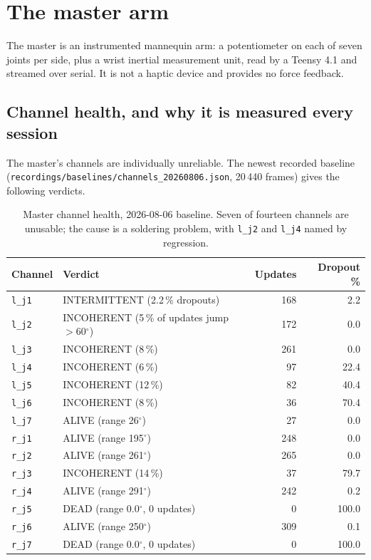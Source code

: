 \documentclass[11pt,a4paper,oneside]{report}
\newcommand{\code}[1]{\texttt{\small #1}}
\newcommand{\file}[1]{\texttt{\small #1}}
\newcommand{\dg}{$^{\circ}$}
\begin{document}
\section{The master arm}

The master is an instrumented mannequin arm: a potentiometer on each of seven
joints per side, plus a wrist inertial measurement unit, read by a Teensy 4.1
and streamed over serial. It is not a haptic device and provides no force
feedback.

\subsection{Channel health, and why it is measured every session}

The master's channels are individually unreliable. The newest recorded
baseline (\file{recordings/baselines/channels\_20260806.json}, 20\,440 frames)
gives the following verdicts.

\begin{table}[H]
\centering
\small
\begin{tabular}{@{}llrr@{}}
\toprule
\textbf{Channel} & \textbf{Verdict} & \textbf{Updates} & \textbf{Dropout \%} \\
\midrule
\code{l\_j1} & INTERMITTENT (2.2\,\% dropouts) & 168 & 2.2 \\
\code{l\_j2} & INCOHERENT (5\,\% of updates jump $>$60\dg) & 172 & 0.0 \\
\code{l\_j3} & INCOHERENT (8\,\%) & 261 & 0.0 \\
\code{l\_j4} & INCOHERENT (6\,\%) & 97 & 22.4 \\
\code{l\_j5} & INCOHERENT (12\,\%) & 82 & 40.4 \\
\code{l\_j6} & INCOHERENT (8\,\%) & 36 & 70.4 \\
\code{l\_j7} & ALIVE (range 26\dg) & 27 & 0.0 \\
\code{r\_j1} & ALIVE (range 195\dg) & 248 & 0.0 \\
\code{r\_j2} & ALIVE (range 261\dg) & 265 & 0.0 \\
\code{r\_j3} & INCOHERENT (14\,\%) & 37 & 79.7 \\
\code{r\_j4} & ALIVE (range 291\dg) & 242 & 0.2 \\
\code{r\_j5} & DEAD (range 0.0\dg, 0 updates) & 0 & 100.0 \\
\code{r\_j6} & ALIVE (range 250\dg) & 309 & 0.1 \\
\code{r\_j7} & DEAD (range 0.0\dg, 0 updates) & 0 & 100.0 \\
\bottomrule
\end{tabular}
\caption{Master channel health, 2026-08-06 baseline. Seven of fourteen
channels are unusable; the cause is a soldering problem, with \code{l\_j2} and
\code{l\_j4} named by regression.}
\end{table}
\end{document}
